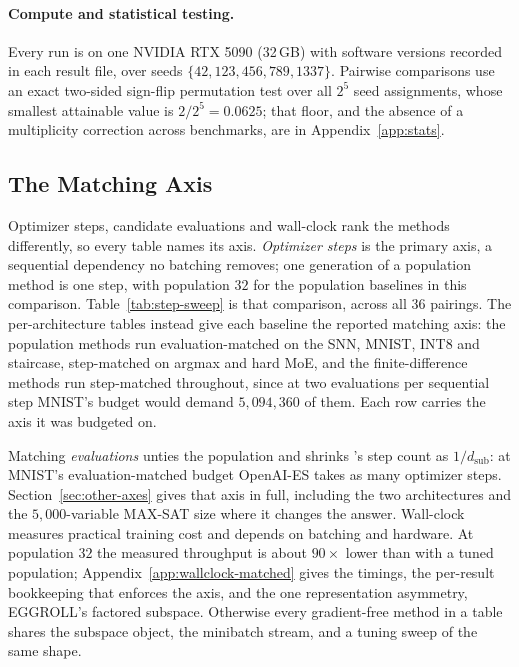 \paragraph{Compute and statistical testing.}
Every run is on one NVIDIA RTX 5090 (32\,GB) with software versions recorded in each result file, over
seeds $\{42, 123, 456, 789, 1337\}$. Pairwise comparisons use an exact two-sided
sign-flip permutation test over all $2^5$ seed assignments, whose smallest attainable
value is $2/2^5 = 0.0625$; that floor, and the absence of a multiplicity correction
across benchmarks, are in Appendix~\ref{app:stats}.

\subsection{The Matching Axis}\label{sec:matching-axis}

Optimizer steps, candidate evaluations and wall-clock rank the methods differently, so
every table names its axis. \emph{Optimizer steps} is the primary axis, a sequential
dependency no batching removes; one generation of a population method is one step, with population $32$ for the population baselines in this comparison. Table~\ref{tab:step-sweep} is that
comparison, across all $36$ pairings. The per-architecture tables instead give each baseline the
reported matching axis: the population methods run evaluation-matched on the SNN, MNIST, INT8 and
staircase, step-matched on argmax and hard MoE, and the finite-difference methods run
step-matched throughout, since at two evaluations per sequential step MNIST's budget
would demand $5{,}094{,}360$ of them. Each row carries the axis it was budgeted on.

Matching \emph{evaluations} unties the population and shrinks \sysname{}'s step count as
$1/d_{\mathrm{sub}}$: at MNIST's evaluation-matched budget OpenAI-ES takes \mnistStepRatio{} as
many optimizer steps. Section~\ref{sec:other-axes} gives that axis in full, including the
two architectures and the $5{,}000$-variable MAX-SAT size where it changes the answer.
Wall-clock measures practical training cost and depends on batching and hardware.
At population $32$ the measured throughput is about $90\times$ lower than with a
tuned population; Appendix~\ref{app:wallclock-matched} gives the timings, the
per-result bookkeeping that enforces the axis, and the one representation asymmetry,
EGGROLL's factored subspace. Otherwise every gradient-free method in a table shares the
subspace object, the minibatch stream, and a tuning sweep of the same shape.

